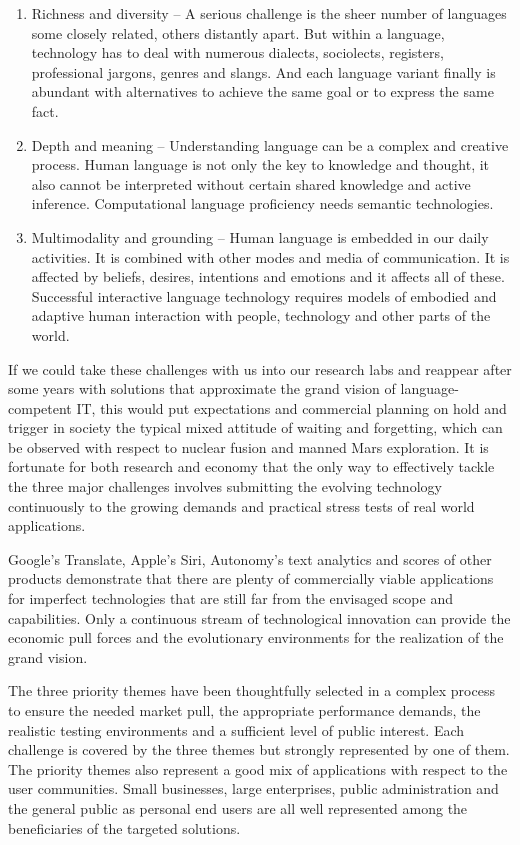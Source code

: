 \documentclass[10pt, plain]{../../metanetpaper}
\begin{document}
\begin{multicols}{2}
\begin{enumerate}
\item Richness and diversity -- A serious challenge is the sheer number of languages some closely related, others distantly apart. But within a language, technology has to deal with numerous dialects, sociolects, registers, professional jargons, genres and slangs. And each language variant finally is abundant with alternatives to achieve the same goal or to express the same fact.
\item Depth and meaning -- Understanding language can be a complex and creative process.  Human language is not only the key to knowledge and thought, it also cannot be interpreted without certain shared knowledge and active inference. Computational language proficiency needs semantic technologies.
\item Multimodality and grounding -- Human language is embedded in our daily activities. It is combined with other modes and media of communication. It is affected by beliefs, desires, intentions and emotions and it affects all of these. Successful interactive language technology requires models of embodied and adaptive human interaction with people, technology and other parts of the world.
\end{enumerate}
 
If we could take these challenges with us into our research labs and reappear after some years with solutions that approximate the grand vision of language-competent IT, this would put expectations and commercial planning on hold and trigger in society the typical mixed attitude of waiting and forgetting, which can be observed with respect to nuclear fusion and manned Mars exploration. It is fortunate for both research and economy that the only way to effectively tackle the three major challenges involves submitting the evolving technology continuously to the growing demands and practical stress tests of real world applications.

Google's Translate, Apple's Siri, Autonomy's text analytics and scores of other products demonstrate that there are plenty of commercially viable applications for imperfect technologies that are still far from the envisaged scope and capabilities. Only a continuous stream of technological innovation can provide the economic pull forces and the evolutionary environments for the realization of the grand vision. 

The three priority themes have been thoughtfully selected in a complex process to ensure the needed market pull, the appropriate performance demands, the realistic testing environments and a sufficient level of public interest. Each challenge is covered by the three themes but strongly represented by one of them.  The priority themes also represent a good mix of applications with respect to the user communities. Small businesses, large enterprises, public administration and the general public as personal end users are all well represented among the beneficiaries of the targeted solutions.  


\end{multicols}
\end{document}

